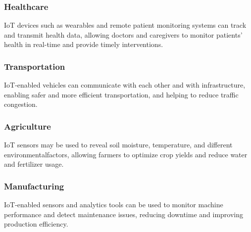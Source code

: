 \documentclass[12pt]{report}
\begin{document}
	\subsubsection*{Healthcare} IoT devices such as wearables and remote patient monitoring systems can track and transmit health data, allowing doctors and caregivers to monitor patients' health in real-time and provide timely interventions. 
	\subsubsection*{Transportation} IoT-enabled vehicles can communicate with each other and with infrastructure, enabling safer and more efficient transportation, and helping to reduce traffic congestion. 
	\subsubsection*{Agriculture} IoT sensors may be used to reveal soil moisture, temperature, and different environmentalfactors, allowing farmers to optimize crop yields and reduce water and fertilizer usage. 
	\subsubsection*{Manufacturing} IoT-enabled sensors and analytics tools can be used to monitor machine performance and detect maintenance issues, reducing downtime and improving production efficiency. 


			
		

	
	
\end{document}

